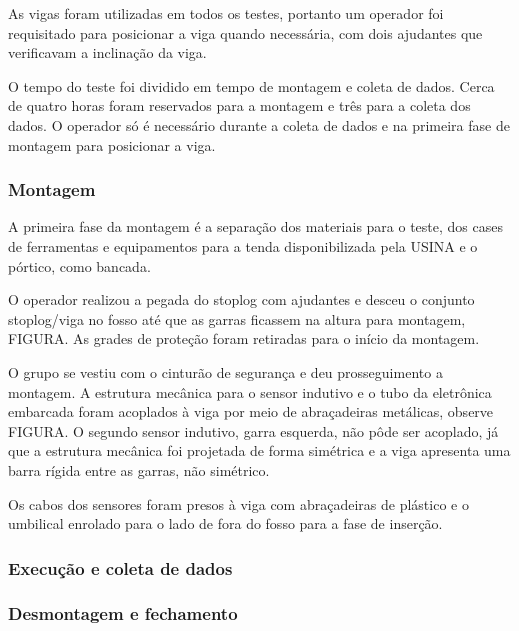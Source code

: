 As vigas foram utilizadas em todos os testes, portanto um operador foi
requisitado para posicionar a viga quando necessária, com dois ajudantes que
verificavam a inclinação da viga.

O tempo do teste foi dividido em tempo de montagem e coleta de dados. Cerca de
quatro horas foram reservados para a montagem e três para a coleta dos dados.
O operador só é necessário durante a coleta de dados e na primeira fase de
montagem para posicionar a viga.

\subsubsection{Montagem}
A primeira fase da montagem é a separação dos materiais para o teste, dos cases
de ferramentas e equipamentos para a tenda disponibilizada pela USINA e o
pórtico, como bancada.

O operador realizou a pegada do stoplog com ajudantes e desceu o conjunto
stoplog/viga no fosso até que as garras ficassem na altura para montagem,
FIGURA.
As grades de proteção foram retiradas para o início da montagem.

O grupo se vestiu com o cinturão de segurança e deu prosseguimento a
montagem. A estrutura mecânica para o sensor indutivo e o
tubo da eletrônica embarcada foram acoplados à viga por meio de abraçadeiras
metálicas, observe FIGURA. O segundo sensor indutivo, garra esquerda, não pôde
ser acoplado, já que a estrutura mecânica foi projetada de forma simétrica e a
viga apresenta uma barra rígida entre as garras, não simétrico.

Os cabos dos sensores foram presos à viga com abraçadeiras de plástico e o
umbilical enrolado para o lado de fora do fosso para a fase de inserção.



\subsubsection{Execução e coleta de dados}
\subsubsection{Desmontagem e fechamento}

\label{metodos}


